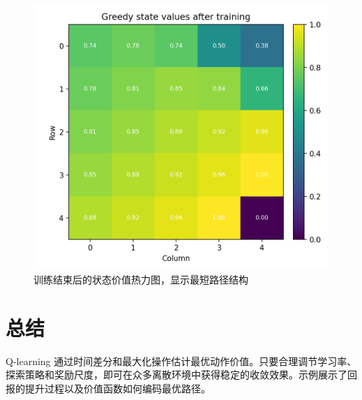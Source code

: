 \documentclass[UTF8,zihao=-4]{ctexart}
\begin{document}
\begin{figure}[H]
  \centering
  \includegraphics[width=0.82\linewidth]{q_learning_state_values.png}
  \caption{训练结束后的状态价值热力图，显示最短路径结构}
  \label{fig:q_learning_state_values_cn}
\end{figure}

\FloatBarrier
\section{总结}
Q-learning 通过时间差分和最大化操作估计最优动作价值。只要合理调节学习率、探索策略和奖励尺度，即可在众多离散环境中获得稳定的收敛效果。示例展示了回报的提升过程以及价值函数如何编码最优路径。
\end{document}

